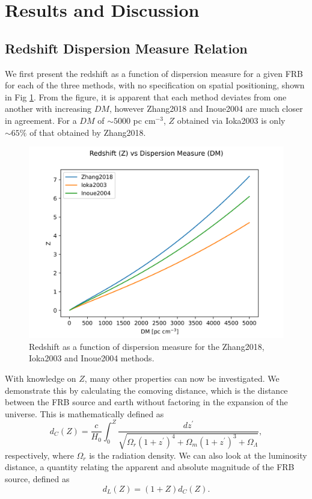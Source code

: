 \documentclass{article}
\begin{document}
\section{Results and Discussion}

\subsection{Redshift Dispersion Measure Relation}

We first present the redshift as a function of dispersion measure for a given FRB for each of the three methods, with no specification on spatial positioning, shown in Fig \ref{fig:ZvDM}. From the figure, it is apparent that each method deviates from one another with increasing $DM$, however Zhang2018 and Inoue2004 are much closer in agreement. For a $DM$ of $\sim5000$ pc cm$^{-3}$, $Z$ obtained via Ioka2003 is only $\sim65\%$ of that obtained by Zhang2018.  

\begin{figure}[!htb]
\includegraphics[width=\linewidth]{Z_vs_DM.png}
\caption{Redshift as a function of dispersion measure for the Zhang2018, Ioka2003 and Inoue2004 methods.}
\label{fig:ZvDM}
\end{figure}

With knowledge on $Z$, many other properties can now be investigated. We demonstrate this by calculating the comoving distance, which is the distance between the FRB source and earth without factoring in the expansion of the universe. This is mathematically defined as
\begin{equation}
d_C(Z)=\frac{c}{H_0} \int_0^Z \frac{dz^\prime}{ \sqrt{\Omega_r (1+z^\prime)^4 +\Omega_m (1+z^\prime)^3 + \Omega_\Lambda}  },
\end{equation} 
respectively, where $\Omega_r$ is the radiation density. We can also look at the luminosity distance, a quantity relating the apparent and absolute magnitude of the FRB source, defined as
\begin{equation}
d_L(Z)=(1+Z)d_C(Z).
\end{equation}
\end{document}
